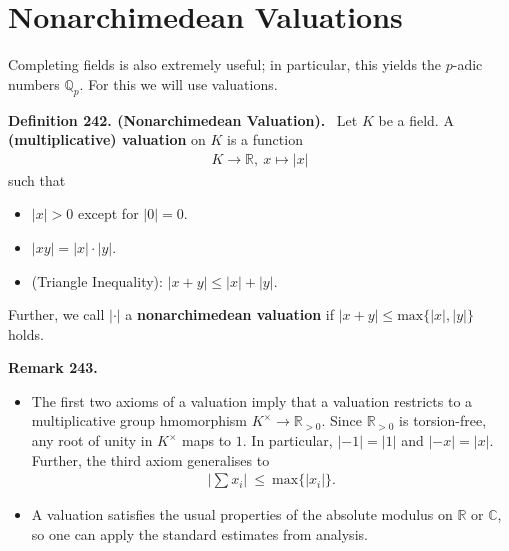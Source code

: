 \documentclass[12pt,a4paper,footinclude=true,headinclude=true]{scrbook} %
\newenvironment{definition}[2][Definition]
    { \begin{mdframed}[backgroundcolor=gray!20] \textbf{#1 #2.}\ }
    {  \end{mdframed}}
\newenvironment{remark}[2][Remark]
    { \begin{mdframed}[backgroundcolor=gray!20] \textbf{#1 #2.} }
    {  \end{mdframed}}
\begin{document}
\section{Nonarchimedean Valuations}
Completing fields is also extremely useful; in particular, this yields the $p$-adic numbers $\mathbb{Q}_p$. For this we will use valuations.
\begin{definition}{242. (Nonarchimedean Valuation)}
    \newline Let $K$ be a field. A \textbf{(multiplicative) valuation} on $K$ is a function
    \begin{align*}
        K\longrightarrow\mathbb{R},\ x\longmapsto|x|
    \end{align*}
    such that
    \begin{itemize}
        \item $|x|>0$ except for $|0|=0$.
        \item $|xy|=|x|\cdot|y|$.
        \item (Triangle Inequality): $|x+y|\leq|x|+|y|$.
    \end{itemize}
    Further, we call $|\cdot|$ a \textbf{nonarchimedean valuation} if $|x+y|\leq\mathrm{max}\{|x|,|y|\}$ holds. 
\end{definition}

\begin{remark}{243}
    \begin{itemize}
        \item[(a)] The first two axioms of a valuation imply that a valuation restricts to a multiplicative group hmomorphism $K^\times\to\mathbb{R}_{>0}$. Since $\mathbb{R}_{>0}$ is torsion-free, any root of unity in $K^\times$ maps to $1$. In particular, $|-1|=|1|$ and $|-x|=|x|$. Further, the third axiom generalises to
        \begin{align*}
            |\sum x_i|\ \leq\ \mathrm{max}\{|x_i|\}.
        \end{align*}
        \item[(b)] A valuation satisfies the usual properties of the absolute modulus on $\mathbb{R}$ or $\mathbb{C}$, so one can apply the standard estimates from analysis.
    \end{itemize}
\end{remark}
\end{document}
